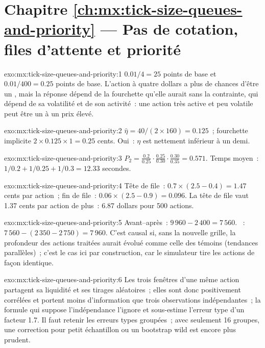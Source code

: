 \section*{Chapitre \ref{ch:mx:tick-size-queues-and-priority} --- Pas de cotation, files d'attente et priorité}

\begin{solution}{exo:mx:tick-size-queues-and-priority:1}
$0.01/4=25$ points de base et $0.01/400=0.25$ points de base. L'action à quatre dollars a plus de chances d'être un , mais la réponse dépend de la fourchette
qu'elle aurait sans la contrainte, qui dépend de sa volatilité et de son activité~: une action très active et peu volatile peut être un  à un prix élevé.
\end{solution}

\begin{solution}{exo:mx:tick-size-queues-and-priority:2}
$\hat\eta=40/(2\times160)=0.125$~; fourchette implicite $2\times0.125\times1=0.25$ cents. Oui~: $\eta$ est nettement inférieur à un demi.
\end{solution}

\begin{solution}{exo:mx:tick-size-queues-and-priority:3}
$P_2=\tfrac{0.2}{0.25}\cdot\tfrac{0.25}{0.30}\cdot\tfrac{0.30}{0.35}=0.571$. Temps moyen~: $1/0.2+1/0.25+1/0.3=12.33$ secondes.
\end{solution}

\begin{solution}{exo:mx:tick-size-queues-and-priority:4}
Tête de file~: $0.7\times(2.5-0.4)=1.47$ cents par action~; fin de file~: $0.06\times(2.5-0.9)=0.096$. La tête de file vaut 1.37 cents par action de plus~: 6.87 dollars pour 500
actions.
\end{solution}

\begin{solution}{exo:mx:tick-size-queues-and-priority:5}
Avant--après~: $9\,960-2\,400=7\,560$. ~: $7\,560-(2\,350-2\,750)=7\,960$. C'est causal si, sans la nouvelle grille, la
profondeur des actions traitées aurait évolué comme celle des témoins (tendances parallèles)~; c'est le cas ici par construction, car le simulateur tire les actions de façon identique.
\end{solution}

\begin{solution}{exo:mx:tick-size-queues-and-priority:6}
Les trois fenêtres d'une même action partagent sa liquidité et ses tirages aléatoires~; elles sont donc positivement corrélées et portent moins d'information que trois
observations indépendantes~; la formule qui suppose l'indépendance l'ignore et sous-estime l'erreur type d'un facteur 1.7. Il faut retenir les erreurs types groupées~; avec seulement 16
groupes, une correction pour petit échantillon ou un bootstrap wild est encore plus prudent.
\end{solution}

